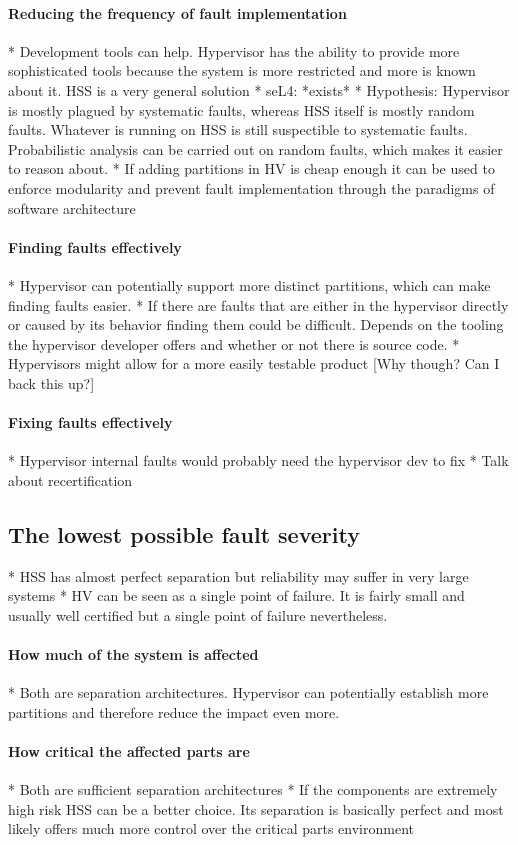 \paragraph{Reducing the frequency of fault implementation}
* Development tools can help. Hypervisor has the ability to provide more sophisticated tools because the system is more restricted and more is known about it. HSS is a very general solution
* seL4: *exists*
* Hypothesis: Hypervisor is mostly plagued by systematic faults, whereas HSS itself is mostly random faults. Whatever is running on HSS is still suspectible to systematic faults. Probabilistic analysis can be carried out on random faults, which makes it easier to reason about.
* If adding partitions in HV is cheap enough it can be used to enforce modularity and prevent fault implementation through the paradigms of software architecture
\paragraph{Finding  faults effectively}
* Hypervisor can potentially support more distinct partitions, which can make finding faults easier. 
* If there are faults that are either in the hypervisor directly or caused by its behavior finding them could be difficult. Depends on the tooling the hypervisor developer offers and whether or not there is source code.
* Hypervisors might allow for a more easily testable product [Why though? Can I back this up?]
\paragraph{Fixing faults effectively}
* Hypervisor internal faults would probably need the hypervisor dev to fix
* Talk about recertification
\subsection{The lowest possible fault severity}
* HSS has almost perfect separation but reliability may suffer in very large systems
* HV can be seen as a single point of failure. It is fairly small and usually well certified but a single point of failure nevertheless. 
\paragraph{How much of the system is affected}
* Both are separation architectures. Hypervisor can potentially establish more partitions and therefore reduce the impact even more.
\paragraph{How critical the affected parts are}
* Both are sufficient separation architectures
* If the components are extremely high risk HSS can be a better choice. Its separation is basically perfect and most likely offers much more control over the critical parts environment
